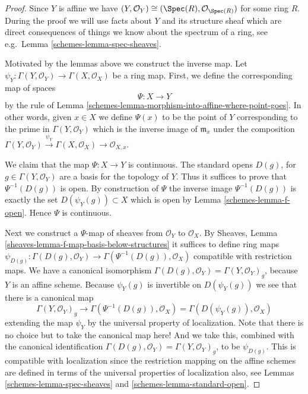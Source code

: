 \begin{proof}

Since $Y$ is affine we have
$(Y, \mathcal{O}_Y) \cong (\Spec(R), \mathcal{O}_{\Spec(R)})$
for some ring $R$.
During the proof we will use facts about $Y$ and
its structure sheaf which are direct consequences of things
we know about the spectrum of a ring, see e.g.\ Lemma
\ref{schemes-lemma-spec-sheaves}.

\medskip\noindent
Motivated by the lemmas above we construct the inverse map.
Let $\psi_Y : \Gamma(Y, \mathcal{O}_Y) \to \Gamma(X, \mathcal{O}_X)$
be a ring map. First, we define the corresponding map of
spaces
$$
\Psi : X \longrightarrow Y
$$
by the rule of
Lemma \ref{schemes-lemma-morphism-into-affine-where-point-goes}.
In other words, given $x \in X$ we define $\Psi(x)$
to be the point of $Y$ corresponding to the prime
in $\Gamma(Y, \mathcal{O}_Y)$ which is the inverse
image of $\mathfrak m_x$ under the composition
$
\Gamma(Y, \mathcal{O}_Y) \xrightarrow{\psi_Y}
\Gamma(X, \mathcal{O}_X) \to
\mathcal{O}_{X, x}
$.

\medskip\noindent
We claim that the map $\Psi : X \to Y$ is continuous.
The standard opens $D(g)$, for $g \in \Gamma(Y, \mathcal{O}_Y)$
are a basis for the topology of $Y$. Thus it suffices to prove
that $\Psi^{-1}(D(g))$ is open. By construction of $\Psi$
the inverse image $\Psi^{-1}(D(g))$ is exactly the set
$D(\psi_Y(g)) \subset X$ which is open by Lemma \ref{schemes-lemma-f-open}.
Hence $\Psi$ is continuous.

\medskip\noindent
Next we construct a $\Psi$-map of sheaves from
$\mathcal{O}_Y$ to $\mathcal{O}_X$. By
Sheaves, Lemma \ref{sheaves-lemma-f-map-basis-below-structures}
it suffices to define ring maps
$\psi_{D(g)} : \Gamma(D(g), \mathcal{O}_Y) \to
\Gamma(\Psi^{-1}(D(g)), \mathcal{O}_X)$
compatible with restriction maps.
We have a canonical isomorphism
$\Gamma(D(g), \mathcal{O}_Y) = \Gamma(Y, \mathcal{O}_Y)_g$,
because $Y$ is an affine scheme.
Because $\psi_Y(g)$ is invertible on $D(\psi_Y(g))$
we see that there is a canonical map
$$
\Gamma(Y, \mathcal{O}_Y)_g
\longrightarrow
\Gamma(\Psi^{-1}(D(g)), \mathcal{O}_X)
=
\Gamma(D(\psi_Y(g)), \mathcal{O}_X)
$$
extending the map $\psi_Y$
by the universal property of localization.
Note that there is no choice but to take the canonical map here!
And we take this, combined
with the canonical identification
$\Gamma(D(g), \mathcal{O}_Y) = \Gamma(Y, \mathcal{O}_Y)_g$, to
be $\psi_{D(g)}$. This is compatible with localization since the
restriction mapping on the affine schemes are defined in terms
of the universal properties of localization also, see
Lemmas \ref{schemes-lemma-spec-sheaves} and \ref{schemes-lemma-standard-open}.


\end{proof}
